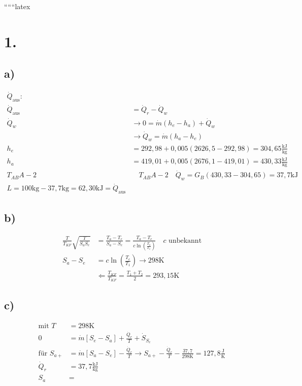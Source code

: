 
``````latex


\section*{1.}
\subsection*{a)}
\begin{align*}
    \dot{Q}_{\text{aus}}: \\
    \dot{Q}_{\text{aus}} &= \dot{Q}_r - \dot{Q}_w \\
    \dot{Q}_w &\rightarrow 0 = \dot{m} (h_e - h_a) + \dot{Q}_w \\
    &\rightarrow \dot{Q}_w = \dot{m} (h_a - h_e) \\
    h_e &= 292,98 + 0,005 (2626,5 - 292,98) = 304,65 \frac{\text{kJ}}{\text{kg}} \\
    h_a &= 419,01 + 0,005 (2676,1 - 419,01) = 430,33 \frac{\text{kJ}}{\text{kg}} \\
    T_{AB} A-2 &\quad T_{AB} A-2 \quad \dot{Q}_w = G_B (430,33 - 304,65) = 37,7 \text{kJ} \\
    L = 100 \text{kg} - 37,7 \text{kg} = 62,30 \text{kJ} = \dot{Q}_{\text{aus}}
\end{align*}

\subsection*{b)}
\begin{align*}
    \frac{T}{T_{KF}} \sqrt{\frac{T}{S_a S_e}} &= \frac{T_a - T_e}{S_a - S_e} = \frac{T_a - T_e}{c \ln \left( \frac{T_a}{T_e} \right)} \quad c \text{ unbekannt} \\
    S_a - S_e &= c \ln \left( \frac{T_e}{T_1} \right) \rightarrow 298 \text{K} \\
    &\Longleftarrow \frac{T_{KF}}{T_{KF}} = \frac{T_1 + T_2}{2} = 293,15 \text{K}
\end{align*}

\subsection*{c)}
\begin{align*}
    \text{mit } T &= 298 \text{K} \\
    0 &= \dot{m} [S_e - S_a] + \frac{\dot{Q}_r}{T} + \dot{S}_{S_e} \\
    \text{für } S_{a+} &= \dot{m} [S_a - S_e] - \frac{\dot{Q}_r}{T} \rightarrow S_{a+} - \frac{\dot{Q}_r}{T} - \frac{37,7}{298 \text{K}} = 127,8 \frac{\text{J}}{\text{K}} \\
    \dot{Q}_r &= 37,7 \frac{\text{kJ}}{\text{kg}} \\
    S_a &=
\end{align*}


